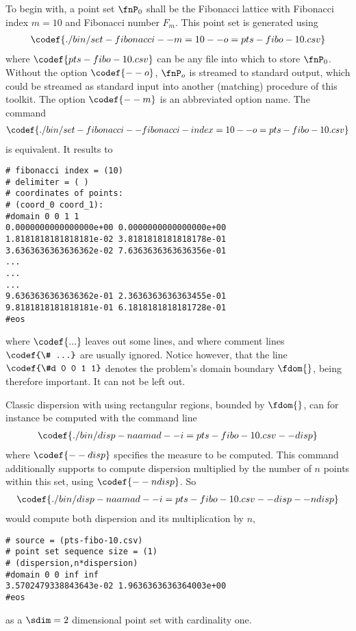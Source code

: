 %
To begin with, a point set $\fnP_0$ shall be the Fibonacci lattice with Fibonacci index $m=10$ and Fibonacci number $F_m$. This point set is generated using
\begin{align*}
  \codef{./bin/set-fibonacci --m=10 --o=pts-fibo-10.csv}
\end{align*}
where $\codef{pts-fibo-10.csv}$ can be any file into which to store $\fnP_0$. Without the option $\codef{--o}$, $\fnP_o$ is streamed to standard output, which could be streamed as standard input into another (matching) procedure of this toolkit. The option $\codef{--m}$ is an abbreviated option name. The command
\begin{align*}
  \codef{./bin/set-fibonacci --fibonacci-index=10 --o=pts-fibo-10.csv}
\end{align*}
is equivalent. It results to
\begin{verbatim}
# fibonacci index = (10)
# delimiter = ( )
# coordinates of points:
# (coord_0 coord_1):
#domain 0 0 1 1
0.0000000000000000e+00 0.0000000000000000e+00
1.8181818181818181e-02 3.8181818181818178e-01
3.6363636363636362e-02 7.6363636363636356e-01
...
...
...
9.6363636363636362e-01 2.3636363636363455e-01
9.8181818181818181e-01 6.1818181818181728e-01
#eos
\end{verbatim}
where $\codef{...}$ leaves out some lines, and where comment lines $\codef{\# ...}$ are usually ignored. Notice however, that the line $\codef{\#d 0 0 1 1}$ denotes the problem's domain boundary $\fdom{}$, being therefore important. It can not be left out.

Classic dispersion with using rectangular regions, bounded by $\fdom{}$, can for instance be computed with the command line
\begin{align*}
  \codef{./bin/disp-naamad --i=pts-fibo-10.csv --disp}
\end{align*}
where $\codef{--disp}$ specifies the measure to be computed. This command additionally supports to compute dispersion multiplied by the number of $n$ points within this set, using $\codef{--ndisp}$. So
\begin{align*}
  \codef{./bin/disp-naamad --i=pts-fibo-10.csv --disp --ndisp}
\end{align*}
would compute both dispersion and its multiplication by $n$,
\begin{verbatim}
# source = (pts-fibo-10.csv)
# point set sequence size = (1)
# (dispersion,n*dispersion)
#domain 0 0 inf inf
3.5702479338843643e-02 1.9636363636364003e+00
#eos
\end{verbatim}
as a $\sdim=2$ dimensional point set with cardinality one.

